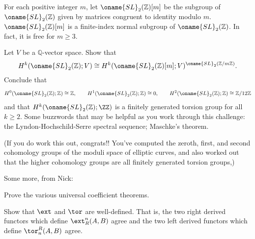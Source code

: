 \documentclass[10pt]{article}
\begin{document}
\begin{exercise}
    \label{exer:}
    For each positive integer $m$, let $\oname{SL}_2(\mathbb{Z}) [m]$
    be the subgroup of $\oname{SL}_2(\mathbb{Z})$ given by
    matrices congruent to identity modulo $m$.
    $\oname{SL}_2(\mathbb{Z})[m]$ is a finite-index
    normal subgroup of $\oname{SL}_2(\mathbb{Z})$.
    In fact, it is free for $m \geq 3$.

    Let $V$ be a $\mathbb{Q}$-vector space.
    Show that
    \begin{equation*}
	H^k(\oname{SL}_2(\mathbb{Z});V)
	\cong H^k(\oname{SL}_2 (\mathbb{Z})[m] ; V)^
	{\oname{SL}_2(\mathbb{Z}/m\mathbb{Z})}.
    \end{equation*}
    Conclude that
    \[
	H^0(\oname{SL}_2(\mathbb{Z});\mathbb{Z})
	\cong \mathbb{Z},\qquad
	H^1(\oname{SL}_2(\mathbb{Z});\mathbb{Z})
	\cong 0,\qquad
	H^2(\oname{SL}_2(\mathbb{Z});\mathbb{Z})
	\cong \mathbb{Z}/12\mathbb{Z}
    \]
    and that $H^k(\oname{SL}_2(\mathbb{Z});\ZZ)$
    is a finitely generated torsion group for all $k \geq 2$.
    Some buzzwords that may be helpful
    as you work through this challenge:
    the Lyndon-Hochschild-Serre spectral sequence; Maschke's theorem.

    (If you do work this out, congrats!!
    You've computed the zeroth, first, and second cohomology groups
    of the moduli space of elliptic curves,
    and also worked out that the higher cohomology groups
    are all finitely generated torsion groups,)
\end{exercise}

Some more, from Nick:

\begin{exercise}
    \label{exer:universal-coefs}
    Prove the various universal coefficient theorems.
\end{exercise}

\begin{exercise}
    \label{exer:ext-tor-well-defined}
    Show that $\ext$ and $\tor$ are well-defined.
    That is, the two right derived functors
    which define $\ext_R^n(A,B)$ agree
    and the two left derived functors
    which define $\tor^R_n(A,B)$ agree.
\end{exercise}

\end{document}
